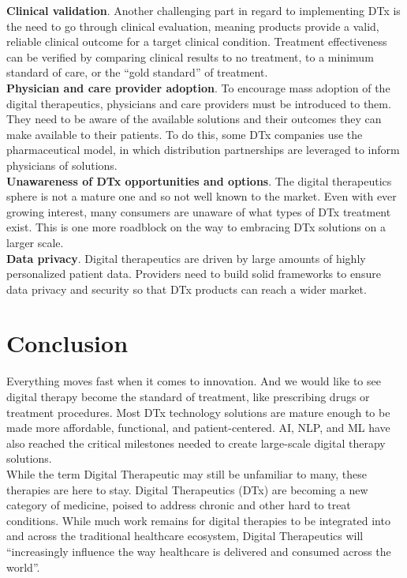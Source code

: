 \documentclass[15pt]{article}
\begin{document}
\textbf{Clinical validation}. Another challenging part in regard to implementing DTx is the need to go through clinical evaluation, meaning products provide a valid, reliable clinical outcome for a target clinical condition. Treatment effectiveness can be verified by comparing clinical results to no treatment, to a minimum standard of care, or the “gold standard” of treatment.\\

\textbf{Physician and care provider adoption}. To encourage mass adoption of the digital therapeutics, physicians and care providers must be introduced to them. They need to be aware of the available solutions and their outcomes they can make available to their patients. To do this, some DTx companies use the pharmaceutical model, in which distribution partnerships are leveraged to inform physicians of solutions.\\

\textbf{Unawareness of DTx opportunities and options}. The digital therapeutics sphere is not a mature one and so not well known to the market. Even with ever growing interest, many consumers are unaware of what types of DTx treatment exist. This is one more roadblock on the way to embracing DTx solutions on a larger scale.\\

\textbf{Data privacy}. Digital therapeutics are driven by large amounts of highly personalized patient data. Providers need to build solid frameworks to ensure data privacy and security so that DTx products can reach a wider market.\\

\section{Conclusion}
Everything moves fast when it comes to innovation. And we would like to see digital therapy become the standard of treatment, like prescribing drugs or treatment procedures. Most DTx technology solutions are mature enough to be made more affordable, functional, and patient-centered. AI, NLP, and ML have also reached the critical milestones needed to create large-scale digital therapy solutions.\\

While the term Digital Therapeutic may still be unfamiliar to many, these therapies are here to stay. Digital Therapeutics (DTx) are becoming a new category of medicine, poised to address chronic and other hard to treat conditions. While much work remains for digital therapies to be integrated into and across the traditional healthcare ecosystem, Digital Therapeutics will “increasingly influence the way healthcare is delivered and consumed across the world”.\\
\end{document}
